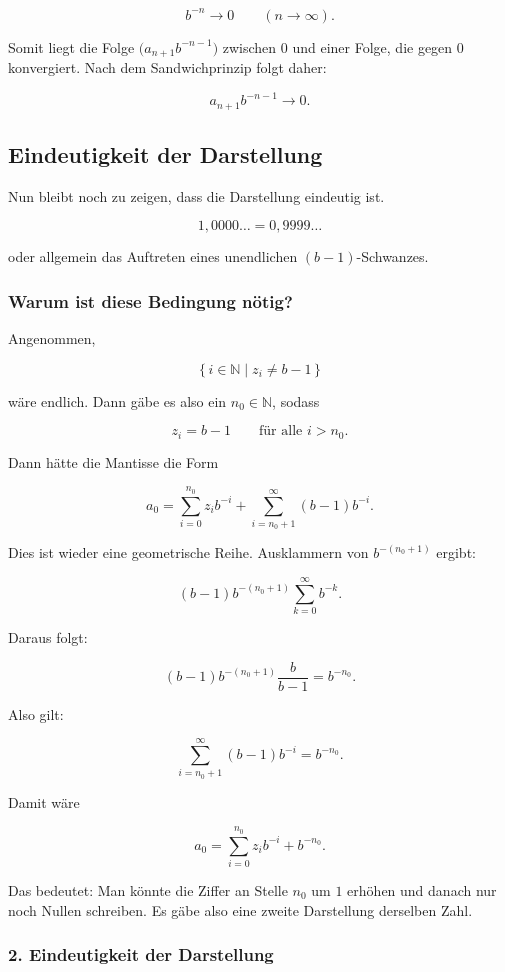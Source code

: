 \documentclass{article}
\begin{document}
\[
b^{-n}\to 0
\qquad (n\to\infty).
\]

Somit liegt die Folge \(\bigl(a_{n+1}b^{-n-1}\bigr)\) zwischen \(0\) und einer Folge, die gegen \(0\) konvergiert. Nach dem Sandwichprinzip folgt daher:

\[
a_{n+1}b^{-n-1}\to 0.
\]


\subsection*{Eindeutigkeit der Darstellung}

Nun bleibt noch zu zeigen, dass die Darstellung eindeutig ist.

\[
1{,}0000\ldots = 0{,}9999\ldots
\]

oder allgemein das Auftreten eines unendlichen \((b-1)\)-Schwanzes.

\subsubsection*{Warum ist diese Bedingung nötig?}

Angenommen,

\[
\{\,i\in\mathbb{N}\mid z_i\neq b-1\,\}
\]

wäre endlich. Dann gäbe es also ein \(n_0\in\mathbb{N}\), sodass

\[
z_i=b-1
\qquad \text{für alle } i>n_0.
\]

Dann hätte die Mantisse die Form

\[
a_0=
\sum_{i=0}^{n_0} z_i b^{-i}
+
\sum_{i=n_0+1}^{\infty}(b-1)b^{-i}.
\]

Dies ist wieder eine geometrische Reihe. Ausklammern von \(b^{-(n_0+1)}\) ergibt:

\[
(b-1)b^{-(n_0+1)}
\sum_{k=0}^{\infty} b^{-k}.
\]

Daraus folgt:

\[
(b-1)b^{-(n_0+1)}\frac{b}{b-1}
=
b^{-n_0}.
\]

Also gilt:

\[
\sum_{i=n_0+1}^{\infty}(b-1)b^{-i}=b^{-n_0}.
\]

Damit wäre

\[
a_0=
\sum_{i=0}^{n_0} z_i b^{-i}+b^{-n_0}.
\]

Das bedeutet: Man könnte die Ziffer an Stelle \(n_0\) um \(1\) erhöhen und danach nur noch Nullen schreiben. Es gäbe also eine zweite Darstellung derselben Zahl.

\subsubsection*{2. Eindeutigkeit der Darstellung}
\end{document}
